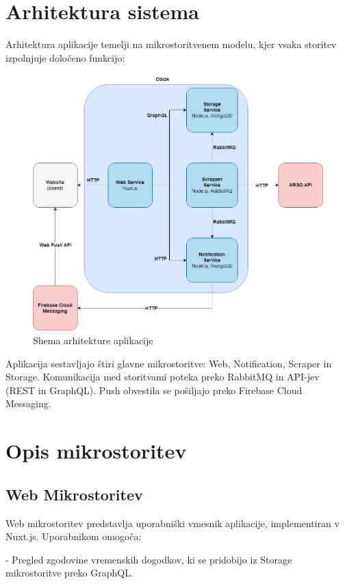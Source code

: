 \documentclass[a4paper,11pt]{article}
\begin{document}
\section*{Arhitektura sistema}
Arhitektura aplikacije temelji na mikrostoritvenem modelu, kjer vsaka storitev izpolnjuje dolo\v{c}eno funkcijo:
\begin{figure}[h!]
	\centering
	\includegraphics[width=\textwidth]{images/architecture.png}
	\caption{Shema arhitekture aplikacije}
\end{figure}

Aplikacija sestavljajo \v{s}tiri glavne mikrostoritve: Web, Notification, Scraper in Storage. Komunikacija med storitvami poteka preko RabbitMQ in API-jev (REST in GraphQL). Push obvestila se po\v{s}iljajo preko Firebase Cloud Messaging.

\section*{Opis mikrostoritev}
\subsection*{Web Mikrostoritev}
Web mikrostoritev predstavlja uporabni\v{s}ki vmesnik aplikacije, implementiran v Nuxt.js. Uporabnikom omogo\v{c}a:

- Pregled zgodovine vremenskih dogodkov, ki se pridobijo iz Storage mikrostoritve preko GraphQL.
\end{document}

